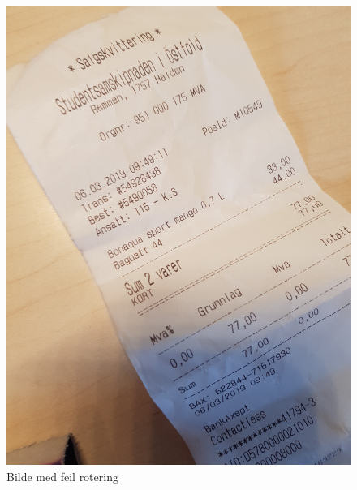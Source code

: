 \documentclass{article}
\begin{document}
\begin{figure}[h]
\centering
\includegraphics[scale=0.05, angle=270]{images/skewed45}
\caption{Bilde med feil rotering}
\label{fig:skewed45}
\end{figure}
\end{document}
